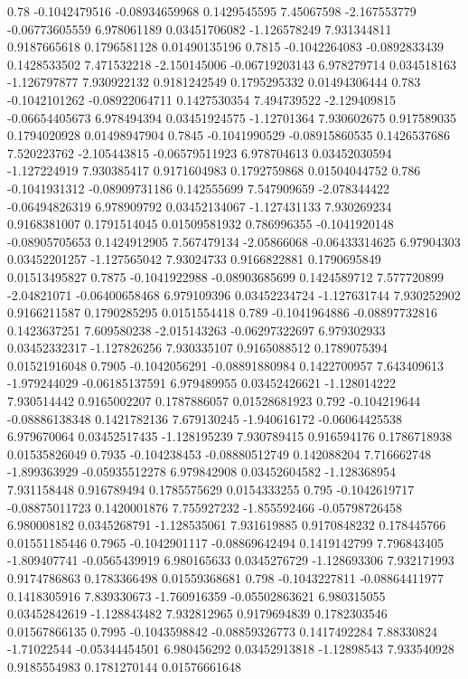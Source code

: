 {0.78 -0.1042479516 -0.08934659968 0.1429545595 7.45067598 -2.167553779 -0.06773605559 6.978061189 0.03451706082 -1.126578249 7.931344811 0.9187665618 0.1796581128 0.01490135196
0.7815 -0.1042264083 -0.0892833439 0.1428533502 7.471532218 -2.150145006 -0.06719203143 6.978279714 0.034518163 -1.126797877 7.930922132 0.9181242549 0.1795295332 0.01494306444
0.783 -0.1042101262 -0.08922064711 0.1427530354 7.494739522 -2.129409815 -0.06654405673 6.978494394 0.03451924575 -1.12701364 7.930602675 0.917589035 0.1794020928 0.01498947904
0.7845 -0.1041990529 -0.08915860535 0.1426537686 7.520223762 -2.105443815 -0.06579511923 6.978704613 0.03452030594 -1.127224919 7.930385417 0.9171604983 0.1792759868 0.01504044752
0.786 -0.1041931312 -0.08909731186 0.142555699 7.547909659 -2.078344422 -0.06494826319 6.978909792 0.03452134067 -1.127431133 7.930269234 0.9168381007 0.1791514045 0.01509581932
0.786996355 -0.1041920148 -0.08905705653 0.1424912905 7.567479134 -2.05866068 -0.06433314625 6.97904303 0.03452201257 -1.127565042 7.93024733 0.9166822881 0.1790695849 0.01513495827
0.7875 -0.1041922988 -0.08903685699 0.1424589712 7.577720899 -2.04821071 -0.06400658468 6.979109396 0.03452234724 -1.127631744 7.930252902 0.9166211587 0.1790285295 0.0151554418
0.789 -0.1041964886 -0.08897732816 0.1423637251 7.609580238 -2.015143263 -0.06297322697 6.979302933 0.03452332317 -1.127826256 7.930335107 0.9165088512 0.1789075394 0.01521916048
0.7905 -0.1042056291 -0.08891880984 0.1422700957 7.643409613 -1.979244029 -0.06185137591 6.979489955 0.03452426621 -1.128014222 7.930514442 0.9165002207 0.1787886057 0.01528681923
0.792 -0.104219644 -0.08886138348 0.1421782136 7.679130245 -1.940616172 -0.06064425538 6.979670064 0.03452517435 -1.128195239 7.930789415 0.916594176 0.1786718938 0.01535826049
0.7935 -0.104238453 -0.08880512749 0.142088204 7.716662748 -1.899363929 -0.05935512278 6.979842908 0.03452604582 -1.128368954 7.931158448 0.916789494 0.1785575629 0.0154333255
0.795 -0.1042619717 -0.08875011723 0.1420001876 7.755927232 -1.855592466 -0.05798726458 6.980008182 0.0345268791 -1.128535061 7.931619885 0.9170848232 0.178445766 0.01551185446
0.7965 -0.1042901117 -0.08869642494 0.1419142799 7.796843405 -1.809407741 -0.0565439919 6.980165633 0.0345276729 -1.128693306 7.932171993 0.9174786863 0.1783366498 0.01559368681
0.798 -0.1043227811 -0.08864411977 0.1418305916 7.839330673 -1.760916359 -0.05502863621 6.980315055 0.03452842619 -1.128843482 7.932812965 0.9179694839 0.1782303546 0.01567866135
0.7995 -0.1043598842 -0.08859326773 0.1417492284 7.88330824 -1.71022544 -0.05344454501 6.980456292 0.03452913818 -1.12898543 7.933540928 0.9185554983 0.1781270144 0.01576661648
}
